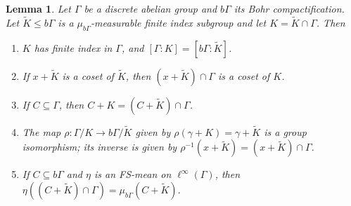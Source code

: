 \documentclass[12pt]{amsart} \usepackage{amsmath,centernot,amssymb,leftindex}
\newtheorem{lemma}[theorem]{Lemma}
\numberwithin{theorem}{section}
\numberwithin{equation}{section}
\theoremstyle{definition}
\begin{document}
\begin{lemma}\label{lem:FiniteIndex}
		Let $\Gamma$ be a discrete abelian group and $b\Gamma$ its Bohr compactification.  Let $\tilde{K}\leq  b\Gamma$ is a $\mu_{b\Gamma}$-measurable finite index subgroup and let $K=\tilde{K}\cap \Gamma$. Then
		
			\begin{enumerate}
			\item[(i)]  $K$ has finite index in $\Gamma$, and $[\Gamma:K]=[b\Gamma:\tilde{K}]$.
			
			\item[(ii)] If $x+\tilde{K}$ is a coset of $\tilde{K}$, then $(x+\tilde{K})\cap \Gamma$ is a coset of $K$.
			
			\item[(iii)] If $C\subseteq \Gamma$, then $C+K = (C+\tilde{K})\cap \Gamma$.
			
			\item[(iv)] The map $\rho: \Gamma/K\to b\Gamma/\tilde{K}$ given by $\rho(\gamma+K)=\gamma+\tilde{K}$ is a group isomorphism; its inverse is given by $\rho^{-1}(x+\tilde{K})=(x+\tilde{K})\cap \Gamma$.
			
			\item[(v)] If $C\subseteq b\Gamma$ and $\eta$ is an FS-mean on $\ell^{\infty}(\Gamma)$, then $\eta((C+\tilde{K})\cap \Gamma)=\mu_{b\Gamma}(C+\tilde{K})$.
		\end{enumerate}
	\end{lemma}
		

	
	
\end{document}

